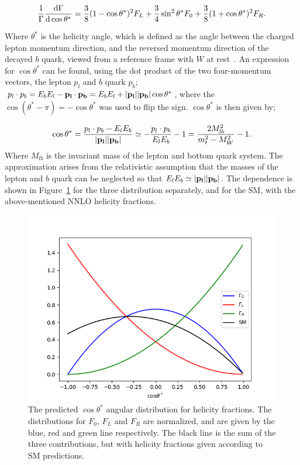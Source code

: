\documentclass[12pt,a4paper]{article}
\numberwithin{equation}{section}
\begin{document}
\begin{equation}
  \frac{1}{\Gamma}\dv{\Gamma}{\cos \theta^*} = \frac{3}{8}(1-\cos \theta^*)^2 F_L +
  \frac{3}{4}\sin^2 \theta^* F_0 + \frac{3}{8}(1+\cos \theta^*)^2 F_R.
\end{equation}

Where $\theta^*$ is the helicity angle, which is defined as the angle between the
charged lepton momentum direction, and the reversed momentum direction of the
decayed $b$ quark, viewed from a reference frame with $W$ at
rest~\cite{PhysRevD.45.124}. An expression for $\cos \theta^*$ can be found, using
the dot product of the two four-momentum vectors, the lepton $p_l$ and $b$ quark
$p_b$; $p_l\cdot p_b=E_bE_l-\vb{p_l\cdot p_b}=E_bE_l+\abs{\vb{p_l}}\abs{\vb{p_b}}\cos \theta^*$,
where the $\cos{(\theta^{*}-\pi)}=-\cos \theta^{*}$ was used to flip the sign.
$\cos \theta^{*}$ is then given by;


\begin{equation}
  \cos \theta^*=\frac{p_l\cdot p_b-E_lE_b}{\abs{\vb{p_l}}\abs{\vb{p_b}}}\\
  \simeq -\frac{p_l\cdot p_b}{E_lE_b} - 1 = \frac{2 M_{lb}^2}{m_t^2 - M_W^2} - 1. \label{eq:costheta}
\end{equation}
Where $M_{lb}$ is the invariant mass of the lepton and bottom quark system. The
approximation arises from the relativistic assumption that the masses of the
lepton and $b$ quark can be neglected so that
$E_lE_b\simeq \abs{\vb{p_l}}\abs{\vb{p_b}}$. The dependence is shown in
Figure~\ref{fig:distributions} for the three distribution separately, and for the
SM, with the above-mentioned NNLO helicity fractions.
\begin{figure}[H]
  \centering
	\includegraphics[width=0.7\linewidth]{figures/angular_dist.png}
	\caption{The predicted $\cos \theta^{*}$ angular distribution for helicity
    fractions. The distributions for $F_{0}$, $F_{L}$ and $F_{R}$ are
    normalized, and are given by the blue, red and green line respectively. The
    black line is the sum of the three contributions, but with helicity
    fractions given according to SM predictions.}\label{fig:distributions}
\end{figure}
\end{document}
